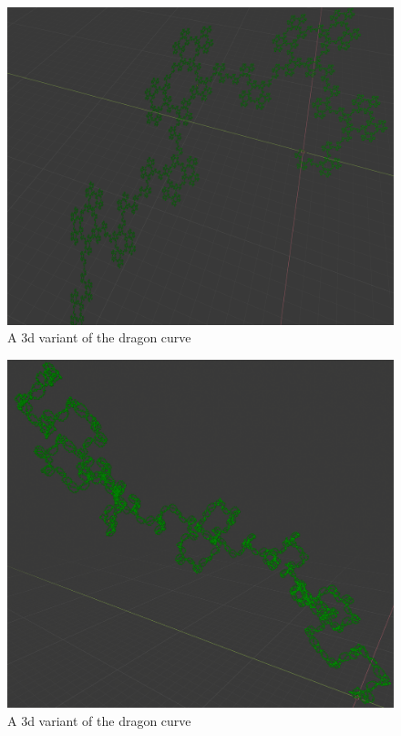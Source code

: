 \begin{figure}[h]
    \centering
    \includegraphics[width=\textwidth]{figures/L-systems/dragon2-3d.png}
    \caption{A 3d variant of the dragon curve}
\end{figure}

\begin{figure}[h]
    \centering
    \includegraphics[width=\textwidth]{figures/L-systems/dragon3-3d.png}
    \caption{A 3d variant of the dragon curve}
\end{figure}

